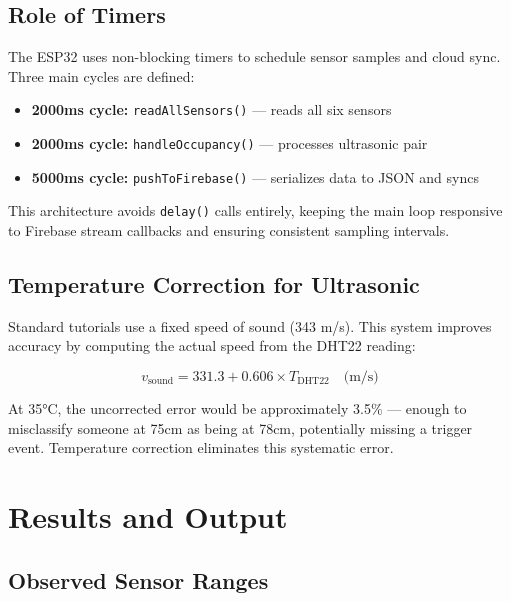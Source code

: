\documentclass[12pt,a4paper]{article}
\begin{document}
\subsection{Role of Timers}

The ESP32 uses non-blocking timers to schedule sensor samples and cloud sync. Three main cycles are defined:

\begin{itemize}[leftmargin=1.5cm]
  \item \textbf{2000ms cycle:} \texttt{readAllSensors()} — reads all six sensors
  \item \textbf{2000ms cycle:} \texttt{handleOccupancy()} — processes ultrasonic pair
  \item \textbf{5000ms cycle:} \texttt{pushToFirebase()} — serializes data to JSON and syncs
\end{itemize}

This architecture avoids \texttt{delay()} calls entirely, keeping the main loop responsive to Firebase stream callbacks and ensuring consistent sampling intervals.

\subsection{Temperature Correction for Ultrasonic}

Standard tutorials use a fixed speed of sound (343 m/s). This system improves accuracy by computing the actual speed from the DHT22 reading:

\[
v_{\text{sound}} = 331.3 + 0.606 \times T_{\text{DHT22}} \quad \text{(m/s)}
\]

At 35°C, the uncorrected error would be approximately 3.5\% — enough to misclassify someone at 75cm as being at 78cm, potentially missing a trigger event. Temperature correction eliminates this systematic error.

\newpage

\section{Results and Output}

\subsection{Observed Sensor Ranges}
\end{document}
